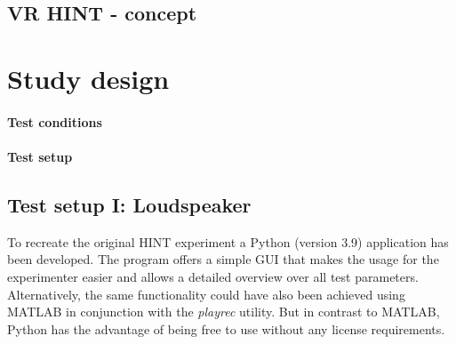 \documentclass[a4paper,11pt]{article}%
\renewcommand{\\}{\vspace*{0.5\baselineskip} \newline}
\begin{document}
\subsection{VR HINT - concept}

\section{Study design}

\paragraph{Test conditions}

\paragraph{Test setup}

\subsection{Test setup I: Loudspeaker}
To recreate the original \ac{HINT} experiment a Python (version 3.9) application has been developed. The program offers a simple \ac{GUI} that makes the usage for the experimenter easier and allows a detailed overview over all test parameters. Alternatively, the same functionality could have also been achieved using MATLAB in conjunction with the \textit{playrec} utility. But in contrast to MATLAB, Python has the advantage of being free to use without any license requirements.
\end{document}
